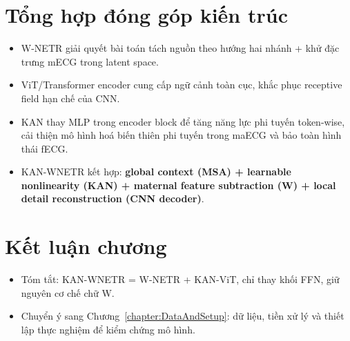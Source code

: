 \documentclass[../DoAn.tex]{subfiles}
\begin{document}
\section{Tổng hợp đóng góp kiến trúc}
\begin{itemize}
  \item W-NETR giải quyết bài toán tách nguồn theo hướng hai nhánh + khử đặc trưng mECG trong latent space.
  \item ViT/Transformer encoder cung cấp ngữ cảnh toàn cục, khắc phục receptive field hạn chế của CNN.
  \item KAN thay MLP trong encoder block để tăng năng lực phi tuyến token-wise, cải thiện mô hình hoá biến thiên phi tuyến trong maECG và bảo toàn hình thái fECG.
  \item KAN-WNETR kết hợp: \textbf{global context (MSA) + learnable nonlinearity (KAN) + maternal feature subtraction (W) + local detail reconstruction (CNN decoder)}.
\end{itemize}

\section{Kết luận chương}
\begin{itemize}
  \item Tóm tắt: KAN-WNETR = W-NETR + KAN-ViT, chỉ thay khối FFN, giữ nguyên cơ chế chữ W.
  \item Chuyển ý sang Chương~\ref{chapter:DataAndSetup}: dữ liệu, tiền xử lý và thiết lập thực nghiệm để kiểm chứng mô hình.
\end{itemize}
\end{document}

